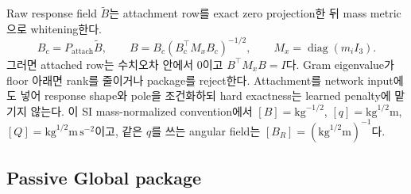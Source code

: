 \documentclass[11pt]{article}
\begin{document}
Raw response field \(\widetilde B\)는 attachment row를 exact zero projection한 뒤 mass metric으로 whitening한다.
\begin{equation}
  B_c=P_{\mathrm{attach}}\widetilde B,\qquad
  B=B_c(B_c^\top M_xB_c)^{-1/2},\qquad
  M_x=\operatorname{diag}(m_iI_3).
  \label{eq:rd-attachment-whitening}
\end{equation}
그러면 attached row는 수치오차 안에서 0이고 \(B^\top M_xB=I\)다.
Gram eigenvalue가 floor 아래면 rank를 줄이거나 package를 reject한다.
Attachment를 network input에도 넣어 response shape와 pole을 조건화하되 hard exactness는 learned penalty에 맡기지 않는다.
이 SI mass-normalized convention에서
\([B]=\mathrm{kg}^{-1/2}\), \([q]=\mathrm{kg}^{1/2}\mathrm m\),
\([Q]=\mathrm{kg}^{1/2}\mathrm m\,\mathrm s^{-2}\)이고,
같은 \(q\)를 쓰는 angular field는
\([B_R]=(\mathrm{kg}^{1/2}\mathrm m)^{-1}\)다.

\subsection{Passive Global package}
\end{document}
